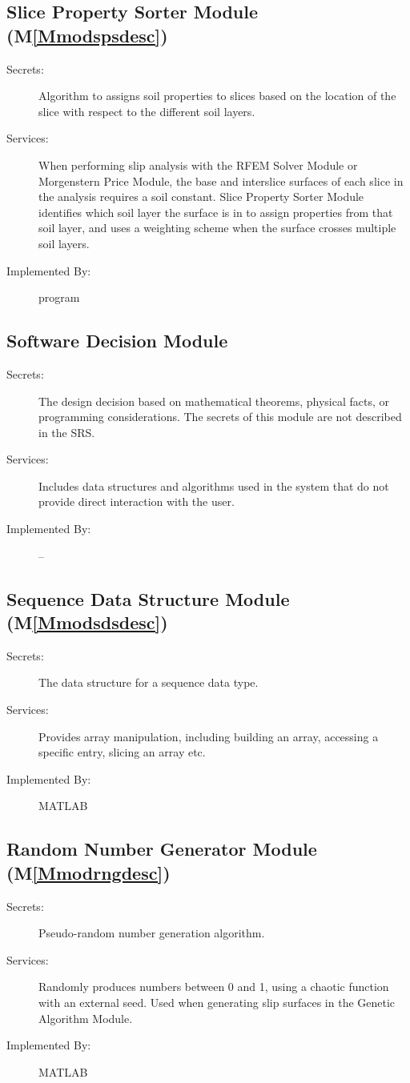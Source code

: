 \documentclass[12pt]{article}
\begin{document}
\subsection{Slice Property Sorter Module (M\ref{Mmodspsdesc})}
\label{Sec:SPSM()}
\begin{description}
\item[Secrets:]Algorithm to assigns soil properties to slices based on the location of the slice with respect to the different soil layers.
\item[Services:]When performing slip analysis with the RFEM Solver Module or Morgenstern Price Module, the base and interslice surfaces of each slice in the analysis requires a soil constant. Slice Property Sorter Module identifies which soil layer the surface is in to assign properties from that soil layer, and uses a weighting scheme when the surface crosses multiple soil layers.
\item[Implemented By:]program
\end{description}
\subsection{Software Decision Module}
\label{Sec:SDM}
\begin{description}
\item[Secrets:]The design decision based on mathematical theorems, physical facts, or programming considerations. The secrets of this module are not described in the SRS.
\item[Services:]Includes data structures and algorithms used in the system that do not provide direct interaction with the user.
\item[Implemented By:]--
\end{description}
\subsection{Sequence Data Structure Module (M\ref{Mmodsdsdesc})}
\label{Sec:SDSM()}
\begin{description}
\item[Secrets:]The data structure for a sequence data type.
\item[Services:]Provides array manipulation, including building an array, accessing a specific entry, slicing an array etc.
\item[Implemented By:]MATLAB
\end{description}
\subsection{Random Number Generator Module (M\ref{Mmodrngdesc})}
\label{Sec:RNGM()}
\begin{description}
\item[Secrets:]Pseudo-random number generation algorithm.
\item[Services:]Randomly produces numbers between 0 and 1, using a chaotic function with an external seed. Used when generating slip surfaces in the Genetic Algorithm Module.
\item[Implemented By:]MATLAB
\end{description}
\end{document}
